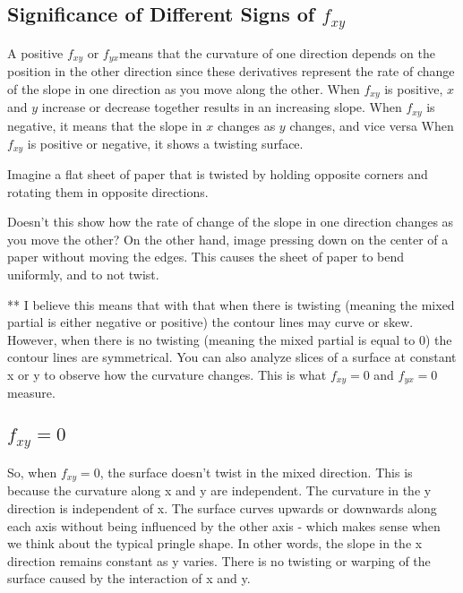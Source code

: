 \documentclass{article}
\begin{document}
\subsection{Significance of Different Signs of \( f_{xy} \)}

A positive \( f_{xy} \) or \( f_{yx} \)means that the curvature of one direction depends on the position in the other direction since these derivatives represent the rate of change of the slope in one direction as you move along the other. When \( f_{xy} \) is positive, \( x \) and \( y \) increase or decrease together results in an increasing slope. When \( f_{xy} \) is negative, it means that the slope in \( x \) changes as \( y \) changes, and vice versa
When \( f_{xy} \) is positive or negative, it shows a twisting surface. 

Imagine a flat sheet of paper that is twisted by holding opposite corners and rotating them in opposite directions. 

Doesn't this show how the rate of change of the slope in one direction changes as you move the other? On the other hand, image pressing down on the center of a paper without moving the edges. This causes the sheet of paper to bend uniformly, and to not twist. 

** I believe this means that with that when there is twisting (meaning the mixed partial is either negative or positive) the contour lines may curve or skew. However, when there is no twisting (meaning the mixed partial is equal to 0) the contour lines are symmetrical. 
You can also analyze slices of a surface at constant x or y to observe how the curvature changes. This is what \( f_{xy} = 0 \) and \( f_{yx} = 0 \) measure.



\subsection{\( f_{xy} = 0 \)}

So, when \( f_{xy} = 0 \), the surface doesn't twist in the mixed direction. This is because the curvature along x and y are independent. The curvature in the y direction is independent of x. The surface curves upwards or downwards along each axis without being influenced by the other axis - which makes sense when we think about the typical pringle shape. In other words, the slope in the x direction remains constant as y varies. There is no twisting or warping of the surface caused by the interaction of x and y. 
\end{document}
